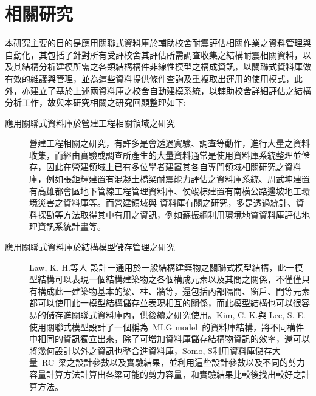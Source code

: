 \renewcommand\thetable{\arabic{chapter}-\arabic{table}}
\renewcommand{\theequation}{\arabic{chapter}-\arabic{equation}}
\chapter{相關研究}

本研究主要的目的是應用關聯式資料庫於輔助校舍耐震評估相關作業之資料管理與自動化，其包括了針對所有受評校舍其評估所需調查收集之結構耐震相關資料，以及其結構分析建模所需之各類結構構件非線性模型之構成資訊，以關聯式資料庫做有效的維護與管理，並為這些資料提供條件查詢及重複取出運用的使用模式，此外，亦建立了基於上述兩資料庫之校舍自動建模系統，以輔助校舍詳細評估之結構分析工作，故與本研究相關之研究回顧整理如下:

\begin{description}
  \item[應用關聯式資料庫於營建工程相關領域之研究]
  營建工程相關之研究，有許多是會透過實驗、調查等動作，進行大量之資料收集，而經由實驗或調查所產生的大量資料通常是使用資料庫系統整理並儲存，因此在營建領域上已有多位學者建置其各自專門領域相關研究之資料庫，例如張鉅輝\cite{chang2003master}建置有混凝土橋梁耐震能力評估之資料庫系統、周武坤\cite{chou2002master}建置有高雄都會區地下管線工程管理資料庫、侯竣棕\cite{hou2000master}建置有南橫公路邊坡地工環境災害之資料庫等。而營建領域與 資料庫有關之研究，多是透過統計、資料探勘等方法取得其中有用之資訊，例如蘇振綱\cite{su2000master}利用環境地質資料庫評估地理資訊系統計畫等。

 \item[應用關聯式資料庫於結構模型儲存管理之研究]
  Law, K. H.等人\cite{law1990management} 設計一通用於一般結構建築物之關聯式模型結構，此一模型結構可以表現一個結構建築物之各個構成元素以及其間之關係，不僅僅只有構成此一建築物基本的梁、柱、牆等，還包括內部隔間、窗戶、門等元素都可以使用此一模型結構儲存並表現相互的關係，而此模型結構也可以很容易的儲存進關聯式資料庫內，供後續之研究使用。Kim, C.-K.與 Lee, S.-E.\cite{kim2000study}使用關聯式模型設計了一個稱為~MLG model~的資料庫結構，將不同構件中相同的資訊獨立出來，除了可增加資料庫儲存結構物資訊的效率，還可以將幾何設計以外之資訊也整合進資料庫，Somo, S\cite{somo2006modeling}利用資料庫儲存大量~RC~梁之設計參數以及實驗結果，並利用這些設計參數以及不同的剪力容量計算方法計算出各梁可能的剪力容量，和實驗結果比較後找出較好之計算方法。


\end{description}
